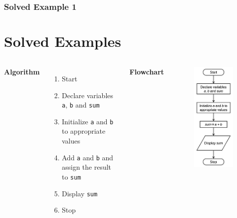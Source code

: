 \documentclass{beamer}
\begin{document}
\begin{frame}[fragile]
    \frametitle{Solved Example 1}
    \section{Solved Examples} %
    \label{sec:solved}
    \begin{columns}
    \textbf{Algorithm}
    \begin{enumerate}
        \item Start
        \item Declare variables \texttt{a}, \texttt{b} and \texttt{sum}
        \item Initialize \texttt{a} and \texttt{b} to appropriate values
        \item Add \texttt{a} and \texttt{b} and assign the result to \texttt{sum}
        \item Display \texttt{sum}
        \item Stop
    \end{enumerate}
    \textbf{Flowchart}
    \begin{figure}
        \centering
        \includegraphics[scale=0.55]{p1flow}
    \end{figure}
    \end{columns}
\end{frame}
\end{document}
